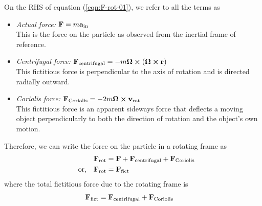 			On the RHS of equation (\ref{eqn:F-rot-01}), we refer to all the terms as
			\begin{itemize}
				\item \emph{Actual force:}
				$\vb{F}=m\vb{a}_\text{in}$\\
				This is the force on the particle as observed from the inertial frame of reference.
				
				\item \emph{Centrifugal force:} $\vb{F}_\text{centrifugal}=-m\vb{\Omega}\cross\qty(\vb{\Omega}\cross\vb{r})$\\
				This fictitious force is perpendicular to the axis of rotation and is directed radially outward.
				
				\item \emph{Coriolis force:} $\vb{F}_\text{Coriolis}=-2m\vb{\Omega}\cross\vb{v}_\text{rot}$\\
				This fictitious force is an apparent sideways force that deflects a moving object perpendicularly to both the direction of rotation and the object's own motion.
			\end{itemize}
			
			Therefore, we can write the force on the particle in a rotating frame as
			\begin{align*}
				\vb{F}_\text{rot}&=\vb{F}+\vb{F}_\text{centrifugal}+\vb{F}_\text{Coriolis} \\
				\qq{or,}\vb{F}_\text{rot}&=\vb{F}_\text{fict}
			\end{align*}
			where the total fictitious force due to the rotating frame is
			\begin{align*}
				\vb{F}_\text{fict}&=\vb{F}_\text{centrifugal}+\vb{F}_\text{Coriolis}
			\end{align*}